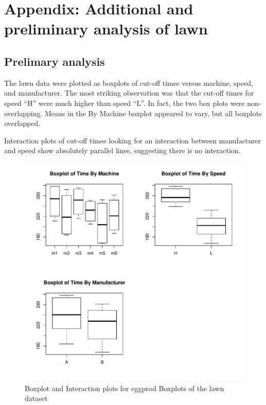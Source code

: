 \documentclass[11pt]{article}
\begin{document}
\section{Appendix: Additional and preliminary analysis of lawn}
\label{sec-5}
\subsection{Prelimary analysis}
\label{sec-5-1}


The lawn data were plotted as boxplots of cut-off times versus
machine, speed, and manufacturer. The most striking observation was
that the cut-off times for speed ``H'' were much higher than speed ``L''.
In fact, the two box plots were non-overlapping. Means in the By
Machine boxplot appeared to vary, but all boxplots overlapped.

Interaction plots of cut-off times looking for an interaction between
manufacturer and speed show absolutely parallel lines, suggesting
there is no interaction.


\begin{figure}[htb]
\centering
\includegraphics[width=.9\linewidth]{lawnplots.pdf}
\caption{Boxplot and Interaction plots for eggprod Boxplots of the lawn dataset}
\end{figure}
\end{document}
